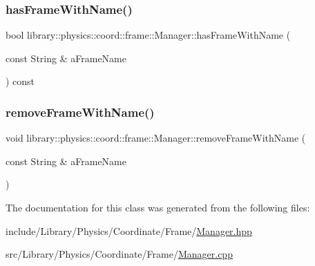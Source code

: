 \mbox{\label{classlibrary_1_1physics_1_1coord_1_1frame_1_1_manager_a842f8a8060172178930aed212c4fcf6d}} 
\subsubsection{\texorpdfstring{has\+Frame\+With\+Name()}{hasFrameWithName()}}
{\footnotesize\ttfamily bool library\+::physics\+::coord\+::frame\+::\+Manager\+::has\+Frame\+With\+Name (\begin{DoxyParamCaption}\item[{const String \&}]{a\+Frame\+Name }\end{DoxyParamCaption}) const}

\mbox{\label{classlibrary_1_1physics_1_1coord_1_1frame_1_1_manager_a63e05e289d34f354dafefbff2b8478af}} 
\subsubsection{\texorpdfstring{remove\+Frame\+With\+Name()}{removeFrameWithName()}}
{\footnotesize\ttfamily void library\+::physics\+::coord\+::frame\+::\+Manager\+::remove\+Frame\+With\+Name (\begin{DoxyParamCaption}\item[{const String \&}]{a\+Frame\+Name }\end{DoxyParamCaption})}



The documentation for this class was generated from the following files\+:\begin{DoxyCompactItemize}
\item 
include/\+Library/\+Physics/\+Coordinate/\+Frame/\hyperlink{_manager_8hpp}{Manager.\+hpp}\item 
src/\+Library/\+Physics/\+Coordinate/\+Frame/\hyperlink{_manager_8cpp}{Manager.\+cpp}\end{DoxyCompactItemize}
